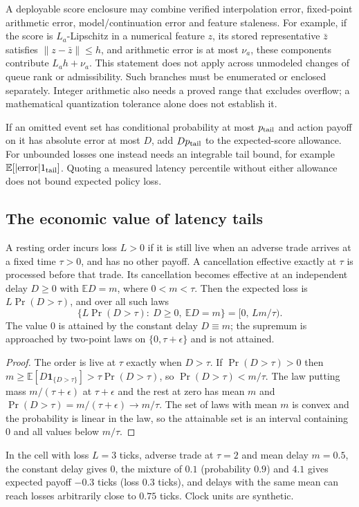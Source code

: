 A deployable score enclosure may combine verified interpolation error,
fixed-point arithmetic error, model/continuation error and feature staleness.
For example, if the score is $L_a$-Lipschitz in a numerical feature $z$, its
stored representative $\bar z$ satisfies $\|z-\bar z\|\le h$, and arithmetic
error is at most $\nu_a$, these components contribute $L_a h+\nu_a$.
This statement does not apply across unmodeled changes of queue rank or
admissibility. Such branches must be enumerated or enclosed separately.
Integer arithmetic also needs a proved range that excludes overflow;
a mathematical quantization tolerance alone does not establish it.

If an omitted event set has conditional probability at most $p_{\rm tail}$
and action payoff on it has absolute error at most $D$, add
$Dp_{\rm tail}$ to the expected-score allowance. For unbounded losses one
instead needs an integrable tail bound, for example
$\mathbb E[|\text{error}|1_{\rm tail}]$. Quoting a measured latency percentile
without either allowance does not bound expected policy loss.

\subsection{The economic value of latency tails}

\begin{proposition}\label{prop:latency-tail}
A resting order incurs loss $L>0$ if it is still live when an adverse trade
arrives at a fixed time $\tau>0$, and has no other payoff. A cancellation
effective exactly at $\tau$ is processed before that trade. Its cancellation
becomes effective at an independent delay $D\ge0$ with $\mathbb ED=m$, where
$0<m<\tau$. Then the expected loss is $L\Pr(D>\tau)$, and over all such laws
\[
  \bigl\{L\Pr(D>\tau):\ D\ge0,\ \mathbb ED=m\bigr\}=[0,\,Lm/\tau).
\]
The value $0$ is attained by the constant delay $D\equiv m$; the supremum is
approached by two-point laws on $\{0,\tau+\epsilon\}$ and is not attained.
\end{proposition}

\begin{proof}
The order is live at $\tau$ exactly when $D>\tau$. If $\Pr(D>\tau)>0$ then
$m\ge\mathbb E[D\mathbf 1_{\{D>\tau\}}]>\tau\Pr(D>\tau)$, so
$\Pr(D>\tau)<m/\tau$. The law putting mass $m/(\tau+\epsilon)$ at
$\tau+\epsilon$ and the rest at zero has mean $m$ and
$\Pr(D>\tau)=m/(\tau+\epsilon)\to m/\tau$. The set of laws with mean $m$ is
convex and the probability is linear in the law, so the attainable set is an
interval containing $0$ and all values below $m/\tau$.
\end{proof}
In the cell with loss $L=3$ ticks, adverse trade at $\tau=2$ and mean delay
$m=0.5$, the constant delay gives $0$, the mixture of $0.1$ (probability $0.9$)
and $4.1$ gives expected payoff $-0.3$ ticks (loss $0.3$ ticks), and delays with the same mean can reach losses
arbitrarily close to $0.75$ ticks. Clock units are synthetic.

